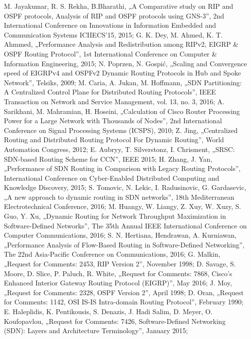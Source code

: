 \documentclass[conference,compsoc]{IEEEtran}
\begin{document}
\begin{thebibliography}{1}
M. Jayakumar, R. S. Rekha, B.Bharathi, „A Comparative study on RIP and OSPF protocols, Analysis of RIP and OSPF protocols using GNS-3”, 2nd International Conference on Innovations in Information Embedded and Communication Systems ICIIECS’15, 2015;
G. K. Dey, M. Ahmed, K. T. Ahmmed, „Performance Analysis and Redistribution among RIPv2, EIGRP \& OSPF Routing Protocol”, 1st International Conference on Computer \& Information Engineering, 2015;
N. Poprzen, N. Gospić, „Scaling and Convergence speed of EIGRPv4 and OSPFv2 Dynamic Routing Protocols in Hub and Spoke Network”, Telsiks, 2009;
M. Caria, A. Jukan, M. Hoffmann, „SDN Partitioning: A Centralized Control Plane for Distributed Routing Protocols”, IEEE Transaction on Network and Service Management, vol. 13, no. 3, 2016;
A. Sarikhani, M. Mahramian, H. Hoseini, „Calculation of Cisco Router Processing Power for a Large Network with Thousands of Nodes”, 2nd International Conference on Signal Processing Systems (ICSPS), 2010;
Z. Jing, „Centralized Routing and Distributed Routing Protocol For Dynamic Routing”, World Automation Congress, 2012;
E. Aubryy, T. Silverstonz, I. Chrisment, „SRSC: SDN-based Routing Scheme for CCN”, IEEE 2015;
H. Zhang, J. Yan, „Performance of SDN Routing in Comparison with Legacy Routing Protocols”, International Conference on Cyber-Enabled Distributed Computing and Knowledge Discovery, 2015;
S. Tomovic, N. Lekic, I. Radusinovic, G. Gardasevic, „A new approach to dynamic routing in SDN networks”, 18th Mediterranean Electrotechnical Conference, 2016;
M. Huangy, W. Liangy, Z. Xuy, W. Xuzy, S. Guo, Y. Xu, „Dynamic Routing for Network Throughput Maximization in Software-Defined Networks”, The 35th Annual IEEE International Conference on Computer Communications, 2016;
S. N. Hertiana, Hendrawan, A. Kurniawan, „Performance Analysis of Flow-Based Routing in Software-Defined Networking”, The 22nd Asia-Pacific Conference on Communications, 2016;
G. Malkin, „Request for Comments: 2453, RIP Version 2”, November 1998;
D. Savage, S. Moore, D. Slice, P. Paluch, R. White, „Request for Comments: 7868, Cisco’s Enhanced Interior Gateway Routing Protocol (EIGRP)”, May 2016;
J. Moy, „Request for Comments: 2328, OSPF Version 2”, April 1998;
D. Oran, „Request for Comments: 1142, OSI IS-IS Intra-domain Routing Protocol”, February 1990;
E. Haleplidis, K. Pentikousis, S. Denazis, J. Hadi Salim, D. Meyer, O. Koufopavlou, „Request for Comments: 7426, Software-Defined Networking (SDN): Layers and Architecture Terminology”, January 2015;



\end{thebibliography}




\end{document}
